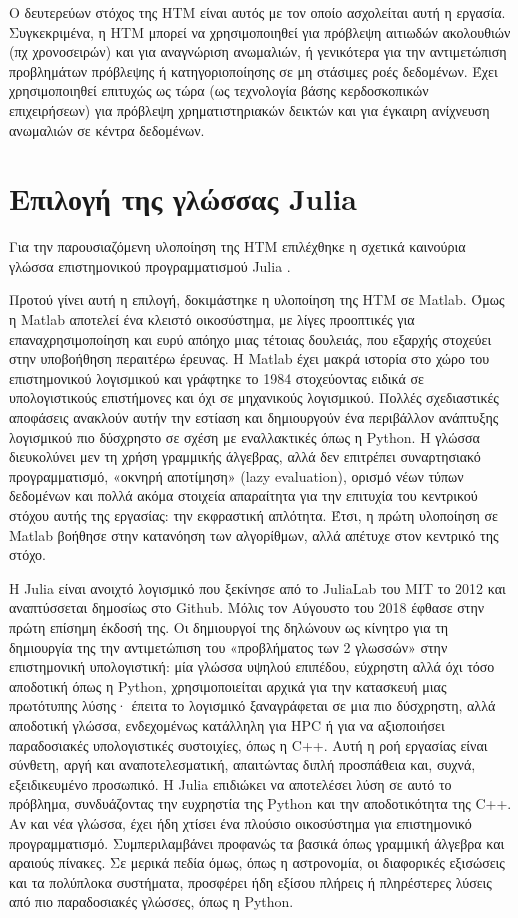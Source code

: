   Ο δευτερεύων στόχος της HTM είναι αυτός με τον οποίο ασχολείται αυτή η εργασία.
  Συγκεκριμένα, η HTM μπορεί να χρησιμοποιηθεί για πρόβλεψη αιτιωδών ακολουθιών (πχ χρονοσειρών) και για αναγνώριση ανωμαλιών,
  ή γενικότερα για την αντιμετώπιση προβλημάτων πρόβλεψης ή κατηγοριοποίησης σε μη στάσιμες ροές δεδομένων.
  Έχει χρησιμοποιηθεί επιτυχώς ως τώρα (ως τεχνολογία βάσης κερδοσκοπικών επιχειρήσεων) για πρόβλεψη χρηματιστηριακών δεικτών
  και για έγκαιρη ανίχνευση ανωμαλιών σε κέντρα δεδομένων.

\section{Επιλογή της γλώσσας Julia}

  Για την παρουσιαζόμενη υλοποίηση της HTM επιλέχθηκε η σχετικά καινούρια γλώσσα επιστημονικού προγραμματισμού Julia \parencite{bezansonJuliaFreshApproach2017}.

  Προτού γίνει αυτή η επιλογή, δοκιμάστηκε η υλοποίηση της HTM σε Matlab.
  Όμως η Matlab αποτελεί ένα κλειστό οικοσύστημα, με λίγες προοπτικές για επαναχρησιμοποίηση και ευρύ απόηχο μιας τέτοιας δουλειάς,
  που εξαρχής στοχεύει στην υποβοήθηση περαιτέρω έρευνας.
  Η Matlab έχει μακρά ιστορία στο χώρο του επιστημονικού λογισμικού και γράφτηκε το 1984 στοχεύοντας ειδικά σε υπολογιστικούς επιστήμονες και όχι σε μηχανικούς λογισμικού.
  Πολλές σχεδιαστικές αποφάσεις ανακλούν αυτήν την εστίαση και δημιουργούν ένα περιβάλλον ανάπτυξης λογισμικού πιο δύσχρηστο σε σχέση με εναλλακτικές όπως η Python.
  Η γλώσσα διευκολύνει μεν τη χρήση γραμμικής άλγεβρας, αλλά δεν επιτρέπει συναρτησιακό προγραμματισμό, «οκνηρή αποτίμηση» (lazy evaluation), ορισμό νέων τύπων δεδομένων
  και πολλά ακόμα στοιχεία απαραίτητα για την επιτυχία του κεντρικού στόχου αυτής της εργασίας: την εκφραστική απλότητα.
  Έτσι, η πρώτη υλοποίηση σε Matlab βοήθησε στην κατανόηση των αλγορίθμων, αλλά απέτυχε στον κεντρικό της στόχο.

  Η Julia είναι ανοιχτό λογισμικό που ξεκίνησε από το JuliaLab του MIT το 2012 και αναπτύσσεται δημοσίως στο Github.
  Μόλις τον Αύγουστο του 2018 έφθασε στην πρώτη επίσημη έκδοσή της.
  Οι δημιουργοί της δηλώνουν ως κίνητρο για τη δημιουργία της την αντιμετώπιση του «προβλήματος των 2 γλωσσών» στην επιστημονική υπολογιστική:
  μία γλώσσα υψηλού επιπέδου, εύχρηστη αλλά όχι τόσο αποδοτική όπως η Python, χρησιμοποιείται αρχικά για την κατασκευή μιας πρωτότυπης λύσης·
  έπειτα το λογισμικό ξαναγράφεται σε μια πιο δύσχρηστη, αλλά αποδοτική γλώσσα,
  ενδεχομένως κατάλληλη για HPC ή για να αξιοποιήσει παραδοσιακές υπολογιστικές συστοιχίες, όπως η C++.
  Αυτή η ροή εργασίας είναι σύνθετη, αργή και αναποτελεσματική, απαιτώντας διπλή προσπάθεια και, συχνά, εξειδικευμένο προσωπικό.
  Η Julia επιδιώκει να αποτελέσει λύση σε αυτό το πρόβλημα, συνδυάζοντας την ευχρηστία της Python και την αποδοτικότητα της C++.
  Αν και νέα γλώσσα, έχει ήδη χτίσει ένα πλούσιο οικοσύστημα για επιστημονικό προγραμματισμό.
  Συμπεριλαμβάνει προφανώς τα βασικά όπως γραμμική άλγεβρα και αραιούς πίνακες.
  Σε μερικά πεδία όμως, όπως η αστρονομία, οι διαφορικές εξισώσεις και τα πολύπλοκα συστήματα, προσφέρει ήδη εξίσου πλήρεις ή πληρέστερες λύσεις
  από πιο παραδοσιακές γλώσσες, όπως η Python.

